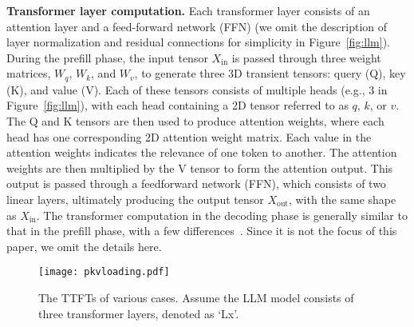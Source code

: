\noindent \textbf{Transformer layer computation.}
Each transformer layer consists of an attention layer and a feed-forward network (FFN) (we omit the description of layer normalization and residual connections for simplicity in Figure~\ref{fig:llm}). 
During the prefill phase, the input tensor \( X_{\text{in}} \) is passed through three weight matrices, \( W_q \), \( W_k \), and \( W_v \), to generate three 3D transient tensors: query (Q), key (K), and value (V). Each of these tensors consists of multiple heads (e.g., 3 in Figure~\ref{fig:llm}), with each head containing a 2D tensor referred to as \( q \), \( k \), or \( v \). 
The Q and K tensors are then used to produce attention weights, where each head has one corresponding 2D attention weight matrix. 
Each value in the attention weights indicates the relevance of one token to another. 
The attention weights are then multiplied by the V tensor to form the attention output. 
This output is passed through a feedforward network (FFN), which consists of two linear layers, ultimately producing the output tensor \( X_{\text{out}} \), with the same shape as \( X_{\text{in}} \).
The transformer computation in the decoding phase is generally similar to that in the prefill phase, with a few differences~\cite{attacc-asplos24}.
 Since it is not the focus of this paper, we omit the details here.

\begin{figure}
	\centering
	\texttt{[image: pkvloading.pdf]}
	\vspace{-0.2in}
	\caption{The TTFTs of various cases. Assume the LLM model consists of three transformer layers, denoted as `Lx'.}
	\label{fig:pkvloading}
	\vspace{-0.1in}
\end{figure}

